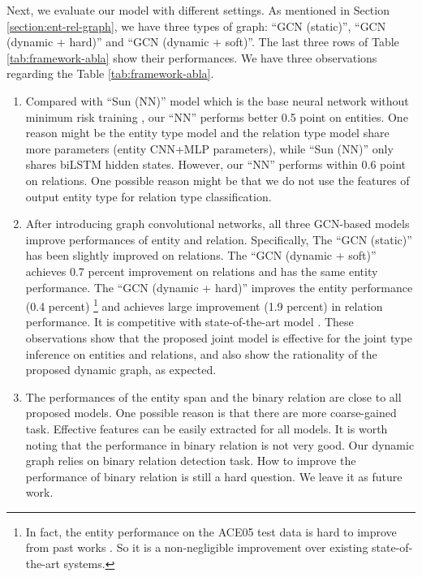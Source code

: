 Next, we evaluate our model with different settings.
As mentioned in Section \ref{section:ent-rel-graph},
we have three types of graph: ``GCN (static)'', ``GCN (dynamic + hard)'' and ``GCN (dynamic + soft)''.
The last three rows of Table \ref{tab:framework-abla} show their performances.
We have three observations regarding the Table \ref{tab:framework-abla}.

\begin{enumerate}[leftmargin=*, itemindent=1pc]
    \item Compared with ``Sun (NN)'' model which is the base neural network without minimum risk training \cite{D18-1249},
    our ``NN''  performs better 0.5 point on entities.
    One reason might be the entity type model and the relation type model share
    more parameters (entity CNN+MLP parameters),
    while ``Sun (NN)''  only shares biLSTM hidden states.
    However,
    our ``NN''  performs within 0.6 point on relations.
    One possible reason might be that
    we do not use the features of output entity type for relation type classification.
    \item 
    After introducing  graph convolutional networks,
    all three GCN-based models improve performances of entity and relation.
    Specifically,
    The ``GCN (static)''  has been slightly improved on relations.
    The ``GCN (dynamic + soft)'' achieves 0.7 percent improvement on relations 
    and has the same entity performance.
    The ``GCN (dynamic + hard)'' improves
    the entity performance (0.4 percent) \footnote{
    In fact, the entity performance on the ACE05 test data 
    is hard to improve from past works \cite{miwa-bansal:2016:P16-1,zhang-zhang-fu:2017:EMNLP2017,D18-1249}. So it is a non-negligible improvement over existing state-of-the-art systems.}
    and achieves large improvement (1.9 percent) in relation performance.
    It is competitive with state-of-the-art model \cite{D18-1249}.
    These observations show that the proposed joint model is effective for the joint type inference on entities and relations,
    and also show the rationality of the proposed dynamic graph, as expected.

    \item The performances of the entity span and the binary relation  are close to all proposed models. 
    One possible reason is that there are more coarse-gained task.
    Effective features can be easily extracted for all models.
    It  is  worth  noting  that the performance in binary relation
    is not very good.
    Our dynamic graph relies on binary relation detection task.
    How to improve the performance of binary relation is still a hard question.
    We leave it as future work.
\end{enumerate}

